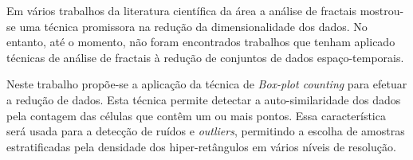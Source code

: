 Em vários trabalhos da literatura científica da área a análise de fractais
mostrou-se uma técnica promissora na redução da dimensionalidade dos dados.
No entanto, até o momento, não foram encontrados trabalhos que tenham aplicado
técnicas de análise de fractais à redução de conjuntos de dados
espaço-temporais.

Neste trabalho propõe-se a aplicação da técnica de \emph{Box-plot counting} para
efetuar a redução de dados. Esta técnica permite detectar a auto-similaridade
dos dados pela contagem das células que contêm um ou mais pontos. Essa
característica será usada para a detecção de ruídos e \emph{outliers},
permitindo a escolha de amostras estratificadas pela densidade dos 
hiper-retângulos em vários níveis de resolução.